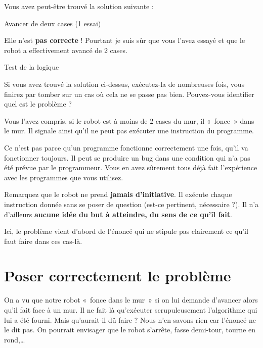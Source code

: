	Vous avez peut-être trouvé la solution suivante :

	\begin{pseudo}{Avancer de deux cases (1 essai)}
	\Begin
	\End
	\end{pseudo}

	Elle n'est \textbf{pas correcte} ! Pourtant je suis sûr
	que vous l'avez essayé et que le robot a effectivement
	avancé de 2 cases. 

	\begin{Emphase}{Test de la logique}

		Si vous avez trouvé la solution ci-dessus, exécutez-la de nombreuses
		fois, vous finirez par tomber sur un cas où cela ne se passe pas bien.
		Pouvez-vous identifier quel est le problème ?

	\end{Emphase}

	Vous l'avez compris, si le robot est à moins de 2 cases
	du mur, il «~fonce~» dans le mur. Il signale ainsi
	qu'il ne peut pas exécuter une instruction du
	programme.
	
	Ce n'est pas parce qu'un programme
	fonctionne correctement une fois, qu'il va fonctionner
	toujours. Il peut se produire un bug dans une condition qui
	n'a pas été prévue par le programmeur. Vous en avez
	sûrement tous déjà fait l'expérience avec les
	programmes que vous utilisez.

	Remarquez que le robot ne prend \textbf{jamais
	d'initiative}. Il exécute chaque instruction donnée
	sans se poser de question (est-ce pertinent, nécessaire ?). Il
	n'a d'ailleurs \textbf{aucune idée du
	but à atteindre, du sens de ce qu'il fait}.
	
	Ici, le problème vient d'abord de
	l'énoncé qui ne stipule pas clairement ce
	qu'il faut faire dans ces cas-là.

\section{Poser correctement le problème}

	On a vu que notre robot «~fonce dans le mur~» si on lui demande
	d'avancer alors qu'il fait face à un
	mur. Il ne fait là qu'exécuter scrupuleusement
	l'algorithme qui lui a été fourni. Mais
	qu'aurait-il dû faire ? Nous n'en
	savons rien car l'énoncé ne le dit pas. On pourrait
	envisager que le robot s'arrête, fasse demi-tour,
	tourne en rond,\dots
	
